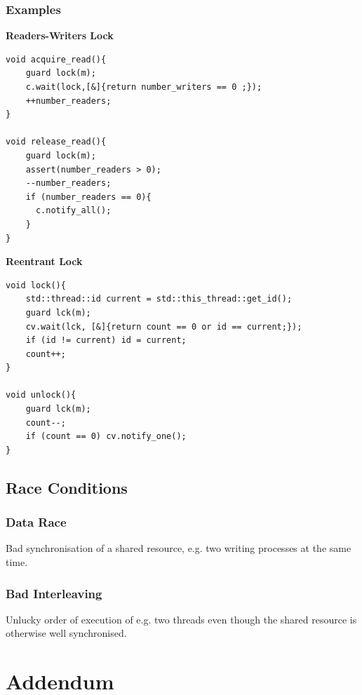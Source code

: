 \documentclass[9pt,landscape,a4paper, table]{extarticle}
\begin{document}
\begin{multicols*}{3}
\subsubsection{Examples}
\textbf{Readers-Writers Lock}
\begin{verbatim}
void acquire_read(){
    guard lock(m);
    c.wait(lock,[&]{return number_writers == 0 ;});
    ++number_readers;
}
  
void release_read(){
    guard lock(m);
    assert(number_readers > 0);
    --number_readers;
    if (number_readers == 0){
      c.notify_all();
    }
}
\end{verbatim}
\textbf{Reentrant Lock}
\begin{verbatim}
void lock(){
    std::thread::id current = std::this_thread::get_id();
    guard lck(m);
    cv.wait(lck, [&]{return count == 0 or id == current;});
    if (id != current) id = current; 
    count++;
}

void unlock(){
    guard lck(m);
    count--;
    if (count == 0) cv.notify_one();
}
\end{verbatim}

\subsection{Race Conditions}
\subsubsection{Data Race}
Bad synchronisation of a shared resource, e.g. two writing processes at the same time.
\subsubsection{Bad Interleaving}
Unlucky order of execution of e.g. two threads even though the shared resource is otherwise well synchronised.

\section{Addendum}

{

}
\end{multicols*}
\end{document}
